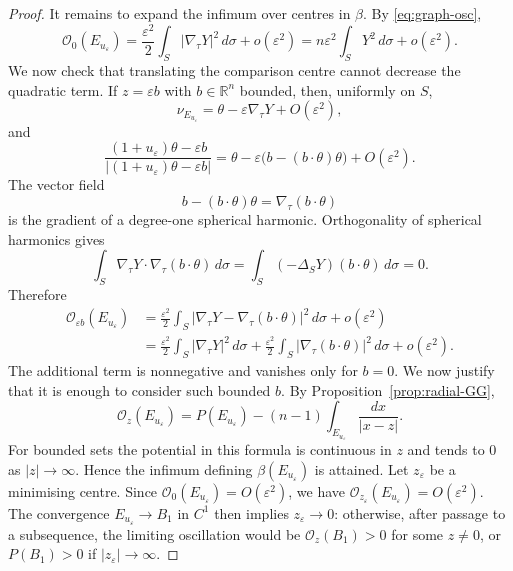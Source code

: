 \documentclass[11pt]{amsart}
\theoremstyle{definition}
\newcommand{\R}{\mathbb R}
\newcommand{\eps}{\varepsilon}
\newcommand{\Per}{P}
\newcommand{\osc}{\mathcal O}
\begin{document}
\begin{proof}
It remains to expand the infimum over centres in \(\beta\).
By \eqref{eq:graph-osc},
\[
   \osc_0(E_{u_\eps})
   =\frac{\eps^2}{2}\int_S|\nabla_\tau Y|^2\,d\sigma+o(\eps^2)
   =n\eps^2\int_SY^2\,d\sigma+o(\eps^2).
\tag{3.56}\label{eq:O0-Y}
\]
We now check that translating the comparison centre cannot decrease the
quadratic term.  If \(z=\eps b\) with \(b\in\R^n\) bounded, then, uniformly on
\(S\),
\[
   \nu_{E_{u_\eps}}=\theta-\eps\nabla_\tau Y+O(\eps^2),
\]
and
\[
   \frac{(1+u_\eps)\theta-\eps b}
        {|(1+u_\eps)\theta-\eps b|}
   =\theta-\eps\bigl(b-(b\cdot\theta)\theta\bigr)+O(\eps^2).
\]
The vector field
\[
   b-(b\cdot\theta)\theta=\nabla_\tau(b\cdot\theta)
\]
is the gradient of a degree-one spherical harmonic.  Orthogonality of
spherical harmonics gives
\[
   \int_S\nabla_\tau Y\cdot\nabla_\tau(b\cdot\theta)\,d\sigma
   =\int_S(-\Delta_SY)(b\cdot\theta)\,d\sigma=0.
\tag{3.57}\label{eq:orthog}
\]
Therefore
\[
\begin{aligned}
   \osc_{\eps b}(E_{u_\eps})
   &=
   \frac{\eps^2}{2}\int_S
   \left|\nabla_\tau Y-\nabla_\tau(b\cdot\theta)\right|^2\,d\sigma
   +o(\eps^2) \\
   &=
   \frac{\eps^2}{2}\int_S|\nabla_\tau Y|^2\,d\sigma
   +\frac{\eps^2}{2}\int_S|\nabla_\tau(b\cdot\theta)|^2\,d\sigma
   +o(\eps^2).
\end{aligned}
\tag{3.58}\label{eq:center-quadratic}
\]
The additional term is nonnegative and vanishes only for \(b=0\).
We now justify that it is enough to consider such bounded \(b\).  By
Proposition~\ref{prop:radial-GG},
\[
   \osc_z(E_{u_\eps})
   =\Per(E_{u_\eps})-(n-1)\int_{E_{u_\eps}}\frac{dx}{|x-z|}.
\]
For bounded sets the potential in this formula is continuous in \(z\) and
tends to \(0\) as \(|z|\to\infty\).  Hence the infimum defining
\(\beta(E_{u_\eps})\) is attained.  Let \(z_\eps\) be a minimising centre.
Since \(\osc_0(E_{u_\eps})=O(\eps^2)\), we have
\(\osc_{z_\eps}(E_{u_\eps})=O(\eps^2)\).  The convergence
\(E_{u_\eps}\to B_1\) in \(C^1\) then implies \(z_\eps\to0\): otherwise,
after passage to a subsequence, the limiting oscillation would be
\(\osc_z(B_1)>0\) for some \(z\ne0\), or \(\Per(B_1)>0\) if
\(|z_\eps|\to\infty\).


\end{proof}
\end{document}
